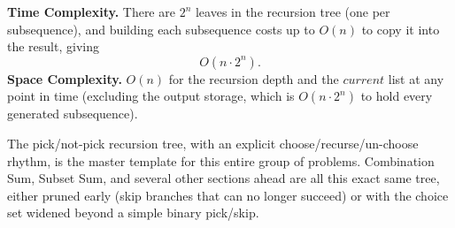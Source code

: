\begin{complexitybox}
\textbf{Time Complexity.} There are $2^n$ leaves in the recursion tree
(one per subsequence), and building each subsequence costs up to $O(n)$
to copy it into the result, giving
\[
  O(n \cdot 2^n).
\]
\textbf{Space Complexity.} $O(n)$ for the recursion depth and the
$\textit{current}$ list at any point in time (excluding the output
storage, which is $O(n \cdot 2^n)$ to hold every generated subsequence).
\end{complexitybox}

\begin{takeawaybox}
The pick/not-pick recursion tree, with an explicit choose/recurse/un-choose
rhythm, is the master template for this entire group of problems.
Combination Sum, Subset Sum, and several other sections ahead are all
this exact same tree, either pruned early (skip branches that can no
longer succeed) or with the choice set widened beyond a simple binary
pick/skip.
\end{takeawaybox}
